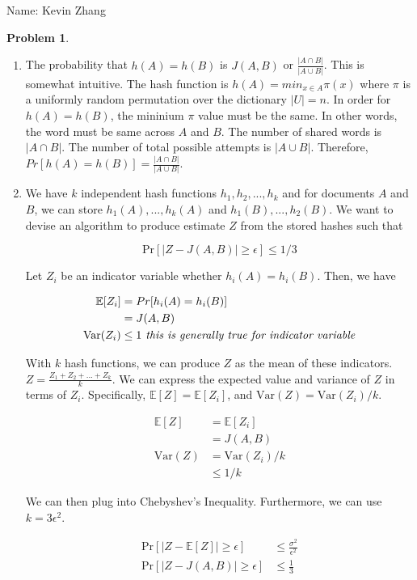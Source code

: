 \documentclass[11pt]{article}
\newcommand{\yourname}{Kevin Zhang}
\theoremstyle{definition}
\theoremstyle{case}
\theoremstyle{theorem}
\newtheorem{prob}{Problem}
\begin{document}
{\large
\noindent Name: \yourname}

\vspace{15pt}

\begin{prob}
\end{prob}

\begin{enumerate}[label=(\alph*)]

\item The probability that $h(A) = h(B)$ is $J(A,B)$ or $\frac{|A \cap B|}{|A \cup B|}$. This is somewhat intuitive. 
The hash function is $h(A) = min_{x \in A} \pi (x)$ where $\pi$ is a uniformly random permutation over the dictionary $|U| = n$.
In order for $h(A) = h(B)$, the mininium $\pi$ value must be the same. In other words, the word must be same across $A$ and $B$.
The number of shared words is $|A \cap B|$. The number of total possible attempts is $|A \cup B|$. 
Therefore, $Pr[h(A) = h(B)] = \frac{|A \cap B|}{|A \cup B|}$.

\item We have $k$ independent hash functions $h_1, h_2, ..., h_k$ and for documents $A$ and $B$, we can store $h_1(A), ..., h_k(A)$
and $h_1(B), ..., h_2(B)$. We want to devise an algorithm to produce estimate $Z$ from the stored hashes such that

\[
  \text{Pr}[|Z - J(A,B)| \geq \epsilon] \leq 1/3
\]

Let $Z_i$ be an indicator variable whether $h_i(A) = h_i(B)$. Then, we have 

\begin{align*}
  \mathbb{E}[Z_i] &= Pr[h_i(A) = h_i(B)] \\
                  &= J(A,B) \\
  \text{Var}(Z_i) &\leq 1 \emph{    this is generally true for indicator variable}
\end{align*}

With $k$ hash functions, we can produce $Z$ as the mean of these indicators. $Z = \frac{Z_1 + Z_2 + ... + Z_k}{k}$.
We can express the expected value and variance of $Z$ in terms of $Z_i$. Specifically, $\mathbb{E}[Z] = \mathbb{E}[Z_i]$,
and $\text{Var}(Z) = \text{Var}(Z_i)/k$.

\begin{align*}
  \mathbb{E}[Z] &= \mathbb{E}[Z_i] \\
                &= J(A,B) \\
  \text{Var}(Z) &= \text{Var}(Z_i)/k \\
                &\leq 1/k
\end{align*}

We can then plug into Chebyshev's Inequality. Furthermore, we can use $k = 3\epsilon^2$. 

\begin{align*}
  \text{Pr}[|Z - \mathbb{E}[Z]| \geq \epsilon] &\leq \frac{\sigma^2}{\epsilon^2} \\
  \text{Pr}[|Z - J(A,B)| \geq \epsilon] &\leq \frac{1}{3} \\
\end{align*}

\end{enumerate}
\end{document}
